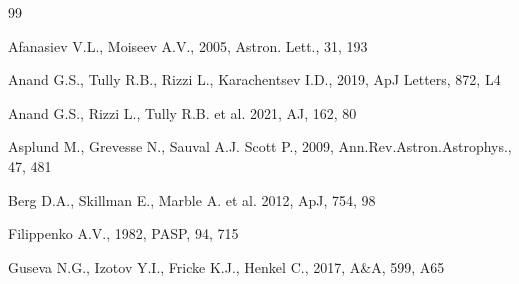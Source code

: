 \documentclass[useAMS,usenatbib]{mn2e}
\newcommand{\mnras}{MNRAS}
\begin{document}
\begin{thebibliography}{99}

  Afanasiev V.L., Moiseev A.V., 2005, Astron. Lett., 31, 193


  Anand G.S., Tully R.B., Rizzi L.,  Karachentsev I.D.,
  2019, ApJ Letters, 872, L4 %


  Anand G.S., Rizzi L., Tully R.B. et al.
  2021, AJ, 162, 80 %


Asplund M., Grevesse N., Sauval A.J. Scott P.,
   2009, Ann.Rev.Astron.Astrophys., 47, 481

    Berg D.A., Skillman E., Marble A. et al.
   2012, ApJ, 754, 98


Filippenko A.V., 1982, PASP, 94, 715

   Guseva N.G., Izotov Y.I., Fricke K.J., Henkel C.,
   2017, A\&A, 599, A65



\end{thebibliography}
\end{document}
